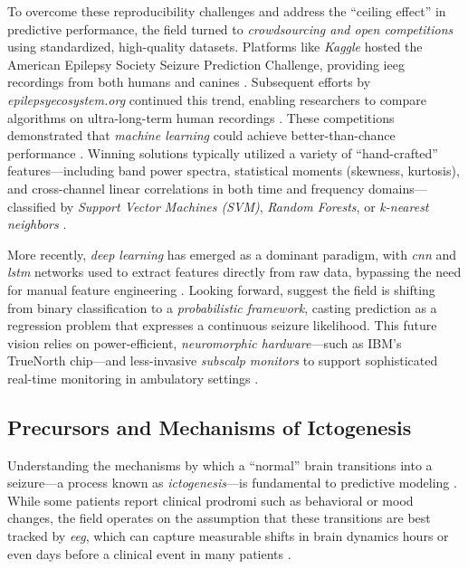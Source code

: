 To overcome these reproducibility challenges and address the \enquote{ceiling effect} in predictive performance, the field turned to \textit{crowdsourcing and open competitions} using standardized, high-quality datasets. Platforms like \textit{Kaggle} hosted the American Epilepsy Society Seizure Prediction Challenge, providing \gls{ieeg} recordings from both humans and canines \parencite{brinkmann_crowdsourcing_2016}.
Subsequent efforts by \textit{epilepsyecosystem.org} continued this trend, enabling researchers to compare algorithms on ultra-long-term human recordings \parencite{kuhlmann_epilepsyecosystemorg_2018}.
These competitions demonstrated that \textit{machine learning} could achieve better-than-chance performance \parencite{brinkmann_crowdsourcing_2016}.
Winning solutions typically utilized a variety of \enquote{hand-crafted} features---including band power spectra, statistical moments (skewness, kurtosis), and cross-channel linear correlations in both time and frequency domains---classified by \textit{Support Vector Machines (SVM)}, \textit{Random Forests}, or \textit{k-nearest neighbors} \parencite{kuhlmann_epilepsyecosystemorg_2018, muller_coherent_2022}.

More recently, \textit{deep learning} has emerged as a dominant paradigm, with \textit{\gls{cnn}} and \textit{\gls{lstm}} networks used to extract features directly from raw data, bypassing the need for manual feature engineering \parencite{kuhlmann_epilepsyecosystemorg_2018, muller_coherent_2022}.
Looking forward, \textcite{freestone_forward-looking_2017} suggest the field is shifting from binary classification to a \textit{probabilistic framework}, casting prediction as a regression problem that expresses a continuous seizure likelihood.
This future vision relies on power-efficient, \textit{neuromorphic hardware}---such as IBM's TrueNorth chip---and less-invasive \textit{subscalp monitors} to support sophisticated real-time monitoring in ambulatory settings \parencite{freestone_forward-looking_2017, yang_seizure_2024}.


\subsection{Precursors and Mechanisms of Ictogenesis}
Understanding the mechanisms by which a \enquote{normal} brain transitions into a seizure---a process known as \textit{ictogenesis}---is fundamental to predictive modeling \parencite{mormann_seizure_2007}.
While some patients report clinical prodromi such as behavioral or mood changes, the field operates on the assumption that these transitions are best tracked by \textit{\gls{eeg}}, which can capture measurable shifts in brain dynamics hours or even days before a clinical event in many patients \parencite{freestone_forward-looking_2017, cook_prediction_2013}.


